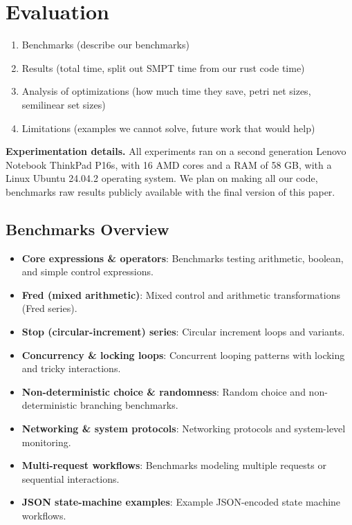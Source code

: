 \section{Evaluation}
\label{sec:evaluation}

\begin{enumerate}
    \item Benchmarks (describe our benchmarks)
    \item Results (total time, split out SMPT time from our rust code time)
    \item Analysis of optimizations (how much time they save, petri net sizes, semilinear set sizes)
    \item Limitations (examples we cannot solve, future work that would help)
\end{enumerate}


\noindent
\textbf{Experimentation details.}
All experiments ran on a second generation Lenovo Notebook ThinkPad P16s, with 16 AMD cores and a RAM of 58 GB, with a Linux Ubuntu 24.04.2 operating system.
%
We plan on making all our code, benchmarks raw results publicly available with the final version of this paper.
 


\subsection{Benchmarks Overview}
\label{subsec:benchmarks}

\begin{itemize}
	\item \textbf{Core expressions \& operators}: Benchmarks testing arithmetic, boolean, and simple control expressions.
	\item \textbf{Fred (mixed arithmetic)}: Mixed control and arithmetic transformations (Fred series).
	\item \textbf{Stop (circular-increment) series}: Circular increment loops and variants.
	\item \textbf{Concurrency \& locking loops}: Concurrent looping patterns with locking and tricky interactions.
	\item \textbf{Non-deterministic choice \& randomness}: Random choice and non-deterministic branching benchmarks.
	\item \textbf{Networking \& system protocols}: Networking protocols and system-level monitoring.
	\item \textbf{Multi-request workflows}: Benchmarks modeling multiple requests or sequential interactions.
	\item \textbf{JSON state-machine examples}: Example JSON-encoded state machine workflows.
\end{itemize}


